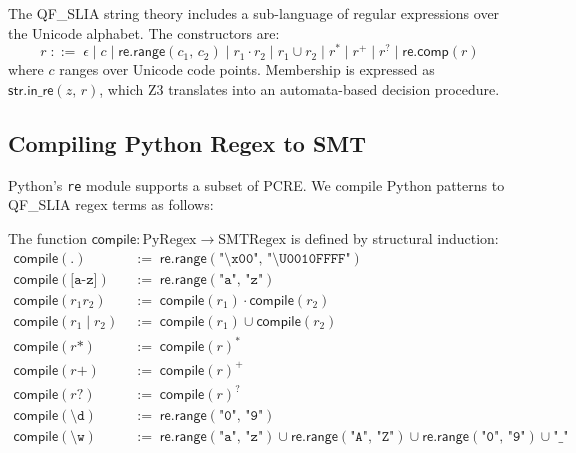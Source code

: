 \documentclass[11pt]{article}
\newcommand{\QFSLIA}{\textsf{QF\_SLIA}}
\newcommand{\strinre}[2]{\ensuremath{\mathsf{str.in\_re}(#1,\,#2)}}
\newcommand{\restar}[1]{\ensuremath{#1^{*}}}
\newcommand{\replus}[1]{\ensuremath{#1^{+}}}
\newcommand{\reopt}[1]{\ensuremath{#1^{?}}}
\newcommand{\rerange}[2]{\ensuremath{\mathsf{re.range}(#1,\,#2)}}
\newcommand{\reunion}[2]{\ensuremath{#1 \cup #2}}
\newcommand{\recat}[2]{\ensuremath{#1 \cdot #2}}
\begin{document}
The \QFSLIA{} string theory includes a sub-language of regular expressions
over the Unicode alphabet.  The constructors are:
\[
  r \;::=\;
    \epsilon
    \mid c
    \mid \rerange{c_1}{c_2}
    \mid \recat{r_1}{r_2}
    \mid \reunion{r_1}{r_2}
    \mid \restar{r}
    \mid \replus{r}
    \mid \reopt{r}
    \mid \mathsf{re.comp}(r)
\]
where $c$ ranges over Unicode code points.  Membership is expressed as
$\strinre{z}{r}$, which Z3 translates into an automata-based decision
procedure.

\subsection{Compiling Python Regex to SMT}
\label{sec:regex-compile}

Python's \texttt{re} module supports a subset of PCRE.  We compile Python
patterns to \QFSLIA{} regex terms as follows:

\begin{definition}
\label{def:regex-compile}
The function $\mathsf{compile} : \mathrm{PyRegex} \to \mathrm{SMTRegex}$ is
defined by structural induction:
\[
\begin{aligned}
  \mathsf{compile}(\texttt{.})           &\;:=\; \rerange{\texttt{"\textbackslash x00"}}{\texttt{"\textbackslash U0010FFFF"}} \\
  \mathsf{compile}(\texttt{[a-z]})       &\;:=\; \rerange{\texttt{"a"}}{\texttt{"z"}} \\
  \mathsf{compile}(r_1 r_2)             &\;:=\; \recat{\mathsf{compile}(r_1)}{\mathsf{compile}(r_2)} \\
  \mathsf{compile}(r_1 \mid r_2)        &\;:=\; \reunion{\mathsf{compile}(r_1)}{\mathsf{compile}(r_2)} \\
  \mathsf{compile}(r\texttt{*})         &\;:=\; \restar{\mathsf{compile}(r)} \\
  \mathsf{compile}(r\texttt{+})         &\;:=\; \replus{\mathsf{compile}(r)} \\
  \mathsf{compile}(r\texttt{?})         &\;:=\; \reopt{\mathsf{compile}(r)} \\
  \mathsf{compile}(\texttt{\textbackslash{}d}) &\;:=\; \rerange{\texttt{"0"}}{\texttt{"9"}} \\
  \mathsf{compile}(\texttt{\textbackslash{}w}) &\;:=\;
    \reunion{\rerange{\texttt{"a"}}{\texttt{"z"}}}{
    \reunion{\rerange{\texttt{"A"}}{\texttt{"Z"}}}{
    \reunion{\rerange{\texttt{"0"}}{\texttt{"9"}}}{\texttt{"\_"}}}}
\end{aligned}
\]
\end{definition}
\end{document}
